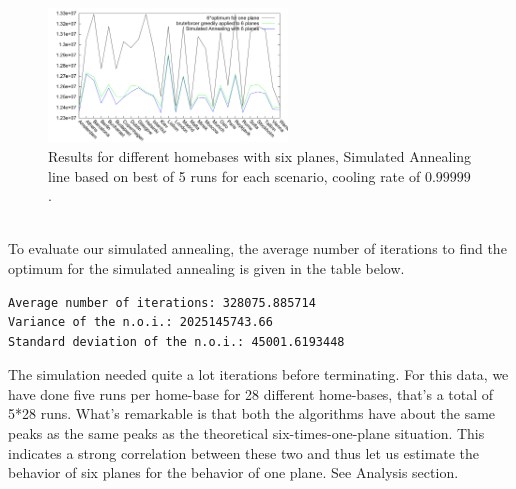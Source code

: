 \documentclass[journal]{IEEEtran}
\begin{document}
\\
\begin{figure}[!h]
\centering
\includegraphics[width=2.5in]{different_homebases}
\caption{Results for different homebases with six planes, Simulated Annealing line based on best of 5 runs for each scenario, cooling rate of $0.99999$.}
\label{fig:different_homebase_six_planes}
\end{figure}
\\
To evaluate our simulated annealing, the average number of iterations to find the optimum for the simulated annealing is given in the table below. 
\begin{lstlisting}
Average number of iterations: 328075.885714
Variance of the n.o.i.: 2025145743.66
Standard deviation of the n.o.i.: 45001.6193448
\end{lstlisting}
The simulation needed quite a lot iterations before terminating. For this data, we have done five runs per home-base for 28 different home-bases, that's a total of 5*28 runs. What's remarkable is that both the algorithms have about the same peaks as the same peaks as the theoretical six-times-one-plane situation.  This indicates a strong correlation between these two and thus let us estimate the behavior of six planes for the behavior of one plane. See Analysis section. 
\\
\end{document}
